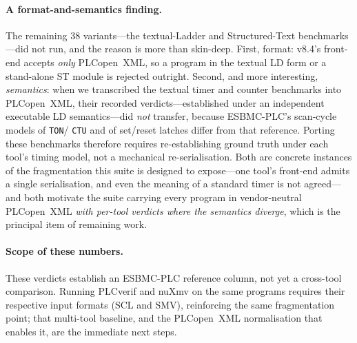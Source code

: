 \paragraph{A format-and-semantics finding.}
The remaining 38 variants---the textual-Ladder and Structured-Text benchmarks---did not run, and
the reason is more than skin-deep. First, format: v8.4's front-end accepts \emph{only}
PLCopen~XML, so a program in the textual LD form or a stand-alone ST module is rejected outright.
Second, and more interesting, \emph{semantics}: when we transcribed the textual timer and counter
benchmarks into PLCopen~XML, their recorded verdicts---established under an independent executable
LD semantics---did \emph{not} transfer, because ESBMC-PLC's scan-cycle models of \texttt{TON}/
\texttt{CTU} and of set/reset latches differ from that reference. Porting these benchmarks
therefore requires re-establishing ground truth under each tool's timing model, not a mechanical
re-serialisation. Both are concrete instances of the fragmentation this suite is designed to
expose---one tool's front-end admits a single serialisation, and even the meaning of a standard
timer is not agreed---and both motivate the suite carrying every program in vendor-neutral
PLCopen~XML \emph{with per-tool verdicts where the semantics diverge}, which is the principal item
of remaining work.

\paragraph{Scope of these numbers.}
These verdicts establish an ESBMC-PLC reference column, not yet a cross-tool comparison.
Running PLCverif and nuXmv on the same programs requires their respective input formats (SCL
and SMV), reinforcing the same fragmentation point; that multi-tool baseline, and the
PLCopen~XML normalisation that enables it, are the immediate next steps.
